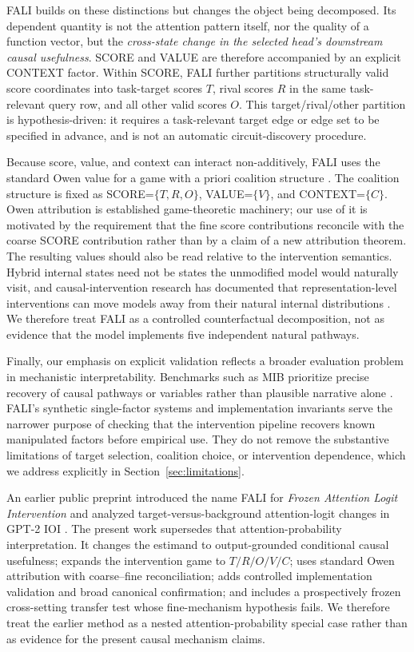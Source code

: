 \documentclass[pdflatex,sn-mathphys-ay]{sn-jnl}
\begin{document}
FALI builds on these distinctions but changes the object being decomposed. Its dependent quantity is not the attention pattern itself, nor the quality of a function vector, but the \emph{cross-state change in the selected head's downstream causal usefulness}. SCORE and VALUE are therefore accompanied by an explicit CONTEXT factor. Within SCORE, FALI further partitions structurally valid score coordinates into task-target scores $T$, rival scores $R$ in the same task-relevant query row, and all other valid scores $O$. This target/rival/other partition is hypothesis-driven: it requires a task-relevant target edge or edge set to be specified in advance, and is not an automatic circuit-discovery procedure.

Because score, value, and context can interact non-additively, FALI uses the standard Owen value for a game with a priori coalition structure \citep{owen1977values}. The coalition structure is fixed as SCORE=$\{T,R,O\}$, VALUE=$\{V\}$, and CONTEXT=$\{C\}$. Owen attribution is established game-theoretic machinery; our use of it is motivated by the requirement that the fine score contributions reconcile with the coarse SCORE contribution rather than by a claim of a new attribution theorem. The resulting values should also be read relative to the intervention semantics. Hybrid internal states need not be states the unmodified model would naturally visit, and causal-intervention research has documented that representation-level interventions can move models away from their natural internal distributions \citep{grant2025divergent}. We therefore treat FALI as a controlled counterfactual decomposition, not as evidence that the model implements five independent natural pathways.

Finally, our emphasis on explicit validation reflects a broader evaluation problem in mechanistic interpretability. Benchmarks such as MIB prioritize precise recovery of causal pathways or variables rather than plausible narrative alone \citep{mueller2025mib}. FALI's synthetic single-factor systems and implementation invariants serve the narrower purpose of checking that the intervention pipeline recovers known manipulated factors before empirical use. They do not remove the substantive limitations of target selection, coalition choice, or intervention dependence, which we address explicitly in Section~\ref{sec:limitations}.

An earlier public preprint introduced the name FALI for \emph{Frozen Attention Logit Intervention} and analyzed target-versus-background attention-logit changes in GPT-2 IOI \citep{sharmila2026attentionrepairs}. The present work supersedes that attention-probability interpretation. It changes the estimand to output-grounded conditional causal usefulness; expands the intervention game to $T/R/O/V/C$; uses standard Owen attribution with coarse--fine reconciliation; adds controlled implementation validation and broad canonical confirmation; and includes a prospectively frozen cross-setting transfer test whose fine-mechanism hypothesis fails. We therefore treat the earlier method as a nested attention-probability special case rather than as evidence for the present causal mechanism claims.
\end{document}
